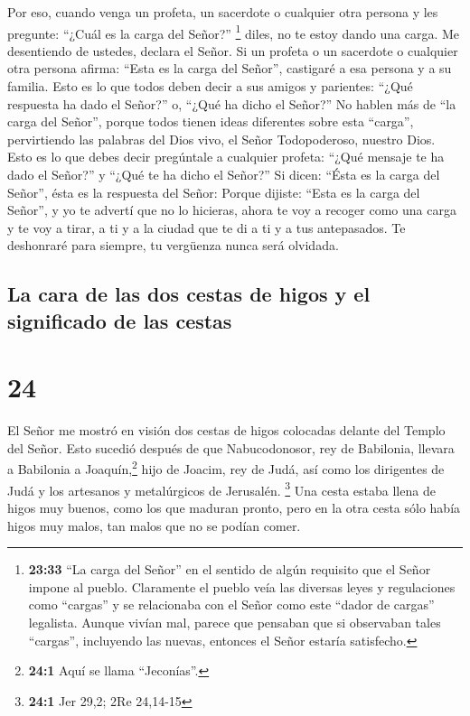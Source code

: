  Por eso, cuando venga un profeta, un sacerdote o
cualquier otra persona y les pregunte: ``¿Cuál es la carga del Señor?''
\footnote{\textbf{23:33} ``La carga del Señor'' en el sentido de algún
  requisito que el Señor impone al pueblo. Claramente el pueblo veía las
  diversas leyes y regulaciones como ``cargas'' y se relacionaba con el
  Señor como este ``dador de cargas'' legalista. Aunque vivían mal,
  parece que pensaban que si observaban tales ``cargas'', incluyendo las
  nuevas, entonces el Señor estaría satisfecho.} diles, no te estoy
dando una carga. Me desentiendo de ustedes, declara el Señor.
 Si un profeta o un sacerdote o cualquier otra persona
afirma: ``Esta es la carga del Señor'', castigaré a esa persona y a su
familia.  Esto es lo que todos deben decir a sus amigos y
parientes: ``¿Qué respuesta ha dado el Señor?'' o, ``¿Qué ha dicho el
Señor?''  No hablen más de ``la carga del Señor'', porque
todos tienen ideas diferentes sobre esta ``carga'', pervirtiendo las
palabras del Dios vivo, el Señor Todopoderoso, nuestro Dios.
 Esto es lo que debes decir pregúntale a cualquier
profeta: ``¿Qué mensaje te ha dado el Señor?'' y ``¿Qué te ha dicho el
Señor?''  Si dicen: ``Ésta es la carga del Señor'', ésta
es la respuesta del Señor: Porque dijiste: ``Esta es la carga del
Señor'', y yo te advertí que no lo hicieras,  ahora te
voy a recoger como una carga y te voy a tirar, a ti y a la ciudad que te
di a ti y a tus antepasados.  Te deshonraré para siempre,
tu vergüenza nunca será olvidada.

\hypertarget{la-cara-de-las-dos-cestas-de-higos-y-el-significado-de-las-cestas}{%
\subsection{La cara de las dos cestas de higos y el significado de las
cestas}\label{la-cara-de-las-dos-cestas-de-higos-y-el-significado-de-las-cestas}}

\hypertarget{section-23}{%
\section{24}\label{section-23}}

 El Señor me mostró en visión dos cestas de higos
colocadas delante del Templo del Señor. Esto sucedió después de que
Nabucodonosor, rey de Babilonia, llevara a Babilonia a
Joaquín,\footnote{\textbf{24:1} Aquí se llama ``Jeconías''.} hijo de
Joacim, rey de Judá, así como los dirigentes de Judá y los artesanos y
metalúrgicos de Jerusalén. \footnote{\textbf{24:1} Jer 29,2; 2Re
  24,14-15}  Una cesta estaba llena de higos muy buenos,
como los que maduran pronto, pero en la otra cesta sólo había higos muy
malos, tan malos que no se podían comer.

